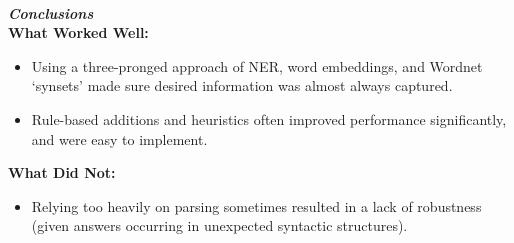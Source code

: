\documentclass[a1,landscape]{a0poster}
\begin{document}
\begin{multicols}{3}
\color{SaddleBrown} %
\textit{\textbf{\LARGE\\Conclusions}}\\
\textbf{What Worked Well:}
\begin{itemize}[noitemsep,topsep=0pt]
    \item Using a three-pronged approach of NER, word embeddings, and Wordnet `synsets' made sure desired information was almost always captured.
    \item Rule-based additions and heuristics often improved performance significantly, and were easy to implement. 
\end{itemize}
\textbf{What Did Not:}
\begin{itemize}[noitemsep,topsep=0pt]
    \item Relying too heavily on parsing sometimes resulted in a lack of robustness (given answers occurring in unexpected syntactic structures).
\end{itemize}
\end{multicols}
\color{DarkSlateGray} %
\nocite{*} %


\end{document}
